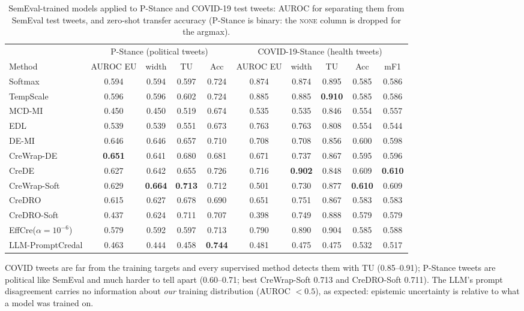 \documentclass[11pt,a4paper]{article}
\newcommand{\best}[1]{\textbf{#1}}
\begin{document}
\begin{table}[h]
\centering\footnotesize\setlength{\tabcolsep}{3.5pt}
\begin{tabular}{l ccc c ccc cc}
\toprule
 & \multicolumn{4}{c}{P-Stance (political tweets)} & \multicolumn{5}{c}{COVID-19-Stance (health tweets)} \\
\cmidrule(lr){2-5}\cmidrule(lr){6-10}
Method & AUROC EU & width & TU & Acc & AUROC EU & width & TU & Acc & mF1 \\
\midrule
Softmax & 0.594 & 0.594 & 0.597 & 0.724 & 0.874 & 0.874 & 0.895 & 0.585 & 0.586 \\
TempScale & 0.596 & 0.596 & 0.602 & 0.724 & 0.885 & 0.885 & \best{0.910} & 0.585 & 0.586 \\
MCD-MI & 0.450 & 0.450 & 0.519 & 0.674 & 0.535 & 0.535 & 0.846 & 0.554 & 0.557 \\
EDL & 0.539 & 0.539 & 0.551 & 0.673 & 0.763 & 0.763 & 0.808 & 0.554 & 0.544 \\
DE-MI & 0.646 & 0.646 & 0.657 & 0.710 & 0.708 & 0.708 & 0.856 & 0.600 & 0.598 \\
CreWrap-DE & \best{0.651} & 0.641 & 0.680 & 0.681 & 0.671 & 0.737 & 0.867 & 0.595 & 0.596 \\
CreDE & 0.627 & 0.642 & 0.655 & 0.726 & 0.716 & \best{0.902} & 0.848 & 0.609 & \best{0.610} \\
CreWrap-Soft & 0.629 & \best{0.664} & \best{0.713} & 0.712 & 0.501 & 0.730 & 0.877 & \best{0.610} & 0.609 \\
CreDRO & 0.615 & 0.627 & 0.678 & 0.690 & 0.651 & 0.751 & 0.867 & 0.583 & 0.583 \\
CreDRO-Soft & 0.437 & 0.624 & 0.711 & 0.707 & 0.398 & 0.749 & 0.888 & 0.579 & 0.579 \\
EffCre($\alpha{=}10^{-6}$) & 0.579 & 0.592 & 0.597 & 0.713 & 0.790 & 0.890 & 0.904 & 0.585 & 0.588 \\
LLM-PromptCredal & 0.463 & 0.444 & 0.458 & \best{0.744} & 0.481 & 0.475 & 0.475 & 0.532 & 0.517 \\
\bottomrule
\end{tabular}
\caption{SemEval-trained models applied to P-Stance and COVID-19 test tweets: AUROC for separating them from SemEval test tweets, and zero-shot transfer accuracy (P-Stance is binary: the \textsc{none} column is dropped for the argmax).}
\label{tab:e4b}
\end{table}

COVID tweets are far from the training targets and every supervised method detects them with TU (0.85--0.91); P-Stance tweets are political like SemEval and much harder to tell apart (0.60--0.71; best CreWrap-Soft 0.713 and CreDRO-Soft 0.711). The LLM's prompt disagreement carries no information about \emph{our} training distribution (AUROC $<0.5$), as expected: epistemic uncertainty is relative to what a model was trained on.
\end{document}
